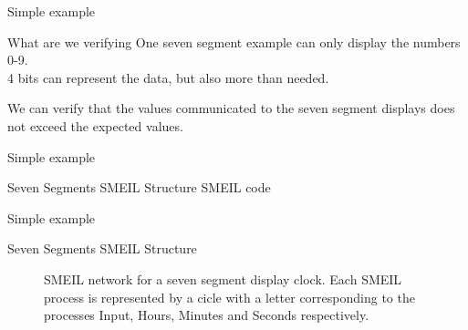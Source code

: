 \documentclass[13pt]{beamer}
\begin{document}
\begin{frame}{Simple example}
 \begin{block}{What are we verifying}
   One seven segment example can only display the numbers 0-9. \\
   4 bits can represent the data, but also more than needed.
 \end{block}

 \pause

 \begin{block}{}
   We can verify that the values communicated to the seven segment displays does not exceed the expected values.
 \end{block}


\end{frame}


\begin{frame}{Simple example}
 \begin{block}{Seven Segments SMEIL Structure}
  SMEIL code
 \end{block}
\end{frame}

\begin{frame}{Simple example}
 \begin{block}{Seven Segments SMEIL Structure}
  \begin{figure}[!ht]
  \centering
  \caption{SMEIL network for a seven segment display clock. Each SMEIL process is represented by a cicle with a letter corresponding to the processes Input, Hours, Minutes and Seconds respectively.}
  \label{fig:smeil_network}
\end{figure}
 \end{block}
\end{frame}
\end{document}
